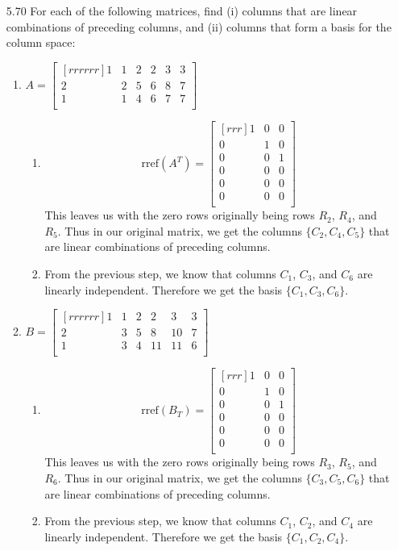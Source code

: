 \documentclass[12pt]{article}
\begin{document}
\begin{enumerate}
\item[5.70] For each of the following matrices, find (i) columns that are linear combinations of preceding columns, and (ii) columns that form a basis for the column space:
	\begin{enumerate}
	\item $A=\begin{bmatrix}[rrrrrr]1&1&2&2&3&3\\2&2&5&6&8&7\\1&1&4&6&7&7\\\end{bmatrix}$
		\begin{enumerate}
		\item
		\[ \mathrm{rref}(A^T) = \begin{bmatrix}[rrr]1&0&0\\0&1&0\\0&0&1\\0&0&0\\0&0&0\\0&0&0\\\end{bmatrix} \]
		This leaves us with the zero rows originally being rows $R_2$, $R_4$, and $R_5$. Thus in our original matrix, we get the columns $\{C_2,C_4,C_5\}$ that are linear combinations of preceding columns. 
		\item From the previous step, we know that columns $C_1$, $C_3$, and $C_6$ are linearly independent. Therefore we get the basis $\{C_1,C_3,C_6\}$.
		\end{enumerate}			
	\item $B=\begin{bmatrix}[rrrrrr]1&1&2&2&3&3\\2&3&5&8&10&7\\1&3&4&11&11&6\\\end{bmatrix}$
		\begin{enumerate}
		\item
		\[ \mathrm{rref}(B_T)=\begin{bmatrix}[rrr]1&0&0\\0&1&0\\0&0&1\\0&0&0\\0&0&0\\0&0&0\\\end{bmatrix}\]
		This leaves us with the zero rows originally being rows $R_3$, $R_5$, and $R_6$. Thus in our original matrix, we get the columns $\{C_3,C_5,C_6\}$ that are linear combinations of preceding columns.
		\item From the previous step, we know that columns $C_1$, $C_2$, and $C_4$ are linearly independent. Therefore we get the basis $\{C_1,C_2,C_4\}$.
		\end{enumerate}			
	\end{enumerate}


\end{enumerate}
\end{document}
